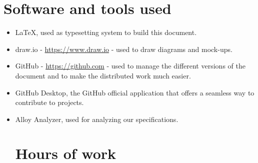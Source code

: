 \section{Software and tools used}
\begin{itemize}
    \item \LaTeX, used as typesetting system to build this document.
    \item draw.io - \url{https://www.draw.io} - used to draw diagrams and mock-ups.
    \item GitHub - \url{https://github.com} - used to manage the different versions of the document and to make the distributed work much easier.
    \item GitHub Desktop, the GitHub official application that offers a seamless way to contribute to projects.
    \item Alloy Analyzer, used for analyzing our specifications.

\section{Hours of work}

\end{itemize}
